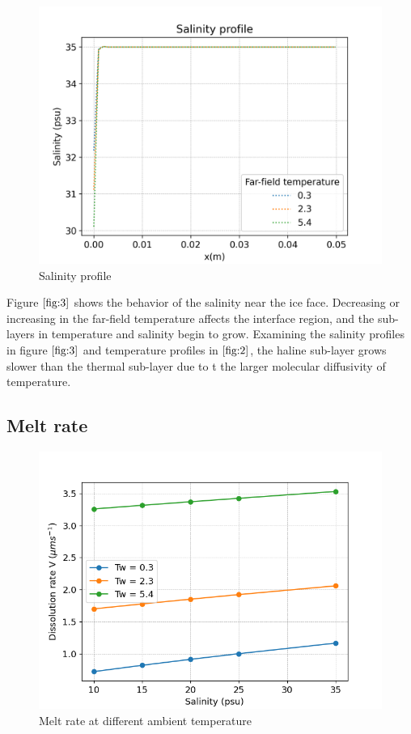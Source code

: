\documentclass[11pt,a4paper]{article}
\begin{document}
	\begin{figure}[H]
	    \centering 
	    \includegraphics[width=12cm]{saltProfile}
	    \caption{Salinity profile}
	    \label{fig:3}
	\end{figure}
	
	Figure $\ref{fig:3}$ shows the behavior of the salinity near the ice face. Decreasing or increasing in the far-field temperature affects the interface region, and the sub-layers in temperature and salinity begin to grow. Examining the salinity profiles in figure $\ref{fig:3}$ and temperature profiles in $\ref{fig:2}$, the haline sub-layer grows slower than the thermal sub-layer due to t the larger molecular diffusivity of temperature.
	
	\subsection{Melt rate}
	
	\begin{figure}[H]
	    \centering 
	    \includegraphics[width=12cm]{melt}
	    \caption{Melt rate at different ambient temperature}
	    \label{fig:4}
	\end{figure}
	
\end{document}
